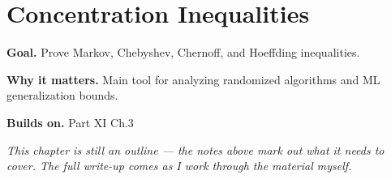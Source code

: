 \chapter{Concentration Inequalities}
\label{ch:11-probability-theory-04}

\begin{chapterintro}
\textbf{Goal.} Prove Markov, Chebyshev, Chernoff, and Hoeffding inequalities.

\textbf{Why it matters.} Main tool for analyzing randomized algorithms and ML generalization bounds.

\textbf{Builds on.} Part XI Ch.3
\end{chapterintro}

\textit{This chapter is still an outline --- the notes above mark out what it needs to cover. The full write-up comes as I work through the material myself.}
